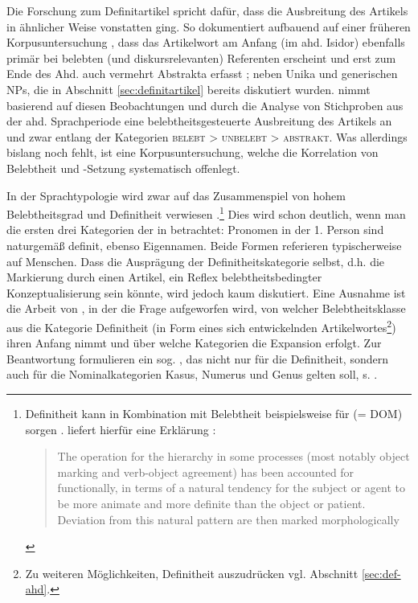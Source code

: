 Die Forschung zum Definitartikel spricht dafür, dass die Ausbreitung des Artikels in ähnlicher Weise vonstatten ging. So dokumentiert \textcite[73ff.]{Oubouzar1992} aufbauend auf einer früheren Korpusuntersuchung \parencite{Oubouzar1989}, dass das  Artikelwort  am Anfang (im ahd. Isidor) ebenfalls primär bei belebten (und diskursrelevanten) Referenten erscheint \parencite[vgl. insbesondere][566-567]{Oubouzar1989} und erst zum Ende des Ahd. auch vermehrt Abstrakta erfasst \parencite[][572]{Oubouzar1989}; neben Unika und generischen NPs, die in Abschnitt \ref{sec:definitartikel} bereits diskutiert wurden. \textcite[74ff.]{Szczepaniak2011} nimmt basierend auf diesen Beobachtungen und durch die Analyse von Stichproben aus der ahd. Sprachperiode eine belebtheitsgesteuerte Ausbreitung des Artikels an und zwar entlang der Kategorien \textsc{belebt > unbelebt > abstrakt}. Was allerdings bislang noch fehlt, ist eine Korpusuntersuchung, welche die Korrelation von Belebtheit und -Setzung systematisch offenlegt. 

In der Sprachtypologie wird zwar auf das Zusammenspiel von hohem Belebtheitsgrad und Definitheit verwiesen \parencites()()[s. z.B.][53]{Dahl1996}[][166f.]{Croft2006}.\footnote{Definitheit kann in Kombination mit Belebtheit beispielsweise für  (= DOM) sorgen \parencite{Aissen2003}. \textcite{Lyons1999} liefert hierfür eine Erklärung \parencite[ähnlich argumentiert auch][119]{Croft1995}: \blockcquote[2014]{Lyons1999}{The operation for the hierarchy in some processes (most notably object marking and verb-object agreement) has been accounted for functionally, in terms of a natural tendency for the subject or agent to be more animate and more definite than the object or patient. Deviation from this natural pattern are then marked morphologically}.}
Dies wird schon deutlich,  wenn man die ersten drei Kategorien der  in  betrachtet: Pronomen in der 1. Person sind naturgemäß definit, ebenso Eigennamen. Beide Formen referieren typischerweise auf Menschen. Dass die Ausprägung der Definitheitskategorie selbst, d.h. die  Markierung durch einen Artikel, ein Reflex belebtheitsbedingter Konzeptualisierung sein könnte, wird jedoch kaum diskutiert. Eine Ausnahme ist die Arbeit von \textcite{Enger2011}, in der die Frage aufgeworfen wird, von welcher Belebtheitsklasse aus die Kategorie Definitheit (in Form eines sich entwickelnden Artikelwortes\footnote{Zu weiteren Möglichkeiten, Definitheit auszudrücken vgl. Abschnitt \ref{sec:def-ahd}.}) ihren Anfang nimmt und über welche Kategorien die Expansion erfolgt. Zur Beantwortung formulieren \textcite[206]{Enger2011} ein sog. , das nicht nur für die Definitheit, sondern auch für die Nominalkategorien Kasus, Numerus und Genus gelten soll, s. . 
   
